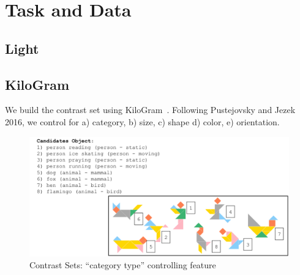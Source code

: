 \section{Task and Data}
\label{sec:task_data}

\subsection{Light}
\cite{urbanek-etal-2019-learning}

\subsection{KiloGram}

We build the contrast set using KiloGram~\cite{ji-etal-2022-abstract}.
Following Pustejovsky and Jezek 2016, we control for a) category, b) size, c) shape d) color, e) orientation.


\begin{figure}
	\centering
	\includegraphics[width=1.0\linewidth]{images/contrast_Set_type.pdf}
\caption{Contrast Sets: ``category type'' controlling feature}
\end{figure}

